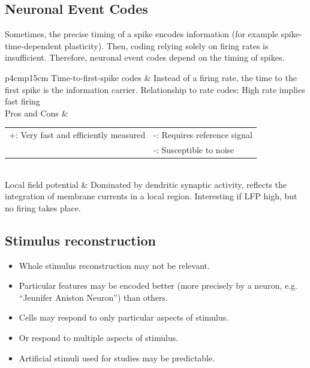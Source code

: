 \subsection{Neuronal Event Codes}
Sometimes, the precise timing of a spike encodes information (for example spike-time-dependent plasticity). Then, coding relying solely on firing rates is insufficient. Therefore, neuronal event codes depend on the timing of spikes.\\
\begin{tabular}{p{4cm}p{15cm}}
Time-to-first-spike codes	& Instead of a firing rate, the time to the first spike is the information carrier. Relationship to rate codes: High rate implies fast firing\\
Pros and Cons			& \begin{tabular}[t]{p{7cm}p{7cm}}
				    +: Very fast and efficiently measured	& -: Requires reference signal\\
										& -: Susceptible to noise\\
				  \end{tabular}\\
Local field potential		& Dominated by dendritic synaptic activity, reflects the integration of membrane currents in a local region. Interesting if LFP high, but no firing takes place.\\
\end{tabular}
\subsection{Stimulus reconstruction}
\begin{itemize}
	\item Whole stimulus reconstruction may not be relevant.
	\item Particular features may be encoded better (more precisely by a neuron, e.g. ``Jennifer Aniston Neuron'') than others.
	\item Cells may respond to only particular aspects of stimulus.
	\item Or respond to multiple aspects of stimulus.
	\item Artificial stimuli used for studies may be predictable.
\end{itemize}